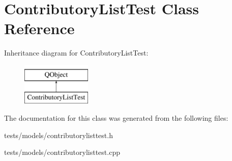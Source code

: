 \hypertarget{classContributoryListTest}{}\section{Contributory\+List\+Test Class Reference}
\label{classContributoryListTest}
Inheritance diagram for Contributory\+List\+Test\+:\begin{figure}[H]
\begin{center}
\leavevmode
\includegraphics[height=2.000000cm]{d4/de2/classContributoryListTest}
\end{center}
\end{figure}


The documentation for this class was generated from the following files\+:\begin{DoxyCompactItemize}
\item 
tests/models/contributorylisttest.\+h\item 
tests/models/contributorylisttest.\+cpp\end{DoxyCompactItemize}
